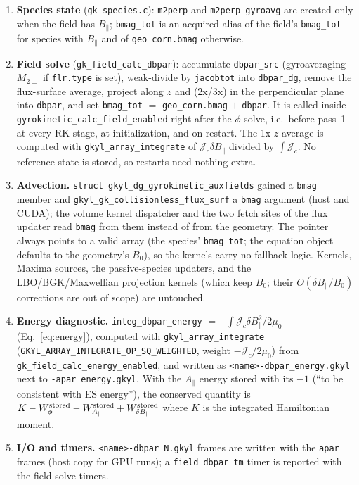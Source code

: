 \documentclass[11pt, letterpaper]{article}
\newcommand{\dBpar}{\delta B_\parallel}
\newcommand{\Apar}{A_\parallel}
\newcommand{\code}[1]{\texttt{#1}}
\begin{document}
\begin{enumerate}
  \item \textbf{Species state} (\code{gk\_species.c}): \code{m2perp} and \code{m2perp\_gyroavg}
  are created only when the field has $B_\parallel$; \code{bmag\_tot} is an acquired alias of the
  field's \code{bmag\_tot} for species with $B_\parallel$ and of \code{geo\_corn.bmag} otherwise.

  \item \textbf{Field solve} (\code{gk\_field\_calc\_dbpar}): accumulate \code{dbpar\_src}
  (gyroaveraging $M_{2\perp}$ if \code{flr.type} is set), weak-divide by \code{jacobtot} into
  \code{dbpar\_dg}, remove the flux-surface average, project along $z$ and (2x/3x) in the
  perpendicular plane into \code{dbpar}, and set \code{bmag\_tot} $=$ \code{geo\_corn.bmag}
  $+$ \code{dbpar}. It is called inside \code{gyrokinetic\_calc\_field\_enabled} right after the
  $\phi$ solve, i.e.\ before pass~1 at every RK stage, at initialization, and on restart. The 1x
  $z$ average is computed with \code{gkyl\_array\_integrate} of $\mathcal{J}_c\dBpar$ divided by
  $\int\mathcal{J}_c$. No reference state is stored, so restarts need nothing extra.

  \item \textbf{Advection.} \code{struct gkyl\_dg\_gyrokinetic\_auxfields} gained a \code{bmag}
  member and \code{gkyl\_gk\_collisionless\_flux\_surf} a \code{bmag} argument (host and CUDA);
  the volume kernel dispatcher and the two fetch sites of the flux updater read \code{bmag} from
  them instead of from the geometry. The pointer always points to a valid array (the species'
  \code{bmag\_tot}; the equation object defaults to the geometry's $B_0$), so the kernels carry no
  fallback logic. Kernels, Maxima sources, the passive-species updaters, and the LBO/BGK/Maxwellian
  projection kernels (which keep $B_0$; their $O(\dBpar/B_0)$ corrections are out of scope) are
  untouched.

  \item \textbf{Energy diagnostic.} \code{integ\_dbpar\_energy} $= -\int\mathcal{J}_c\dBpar^2/2\mu_0$
  (Eq.~\eqref{eq:energy}), computed with \code{gkyl\_array\_integrate}
  (\code{GKYL\_ARRAY\_INTEGRATE\_OP\_SQ\_WEIGHTED}, weight $-\mathcal{J}_c/2\mu_0$) from
  \code{gk\_field\_calc\_energy\_enabled}, and written as \code{<name>-dbpar\_energy.gkyl} next to
  \code{-apar\_energy.gkyl}. With the $\Apar$ energy stored with its $-1$ (``to be consistent with
  ES energy''), the conserved quantity is $K - W_\phi^{\rm stored} - W_{\Apar}^{\rm stored} +
  W_{\dBpar}^{\rm stored}$ where $K$ is the integrated Hamiltonian moment.

  \item \textbf{I/O and timers.} \code{<name>-dbpar\_N.gkyl} frames are written with the
  \code{apar} frames (host copy for GPU runs); a \code{field\_dbpar\_tm} timer is reported with
  the field-solve timers.
\end{enumerate}
\end{document}
